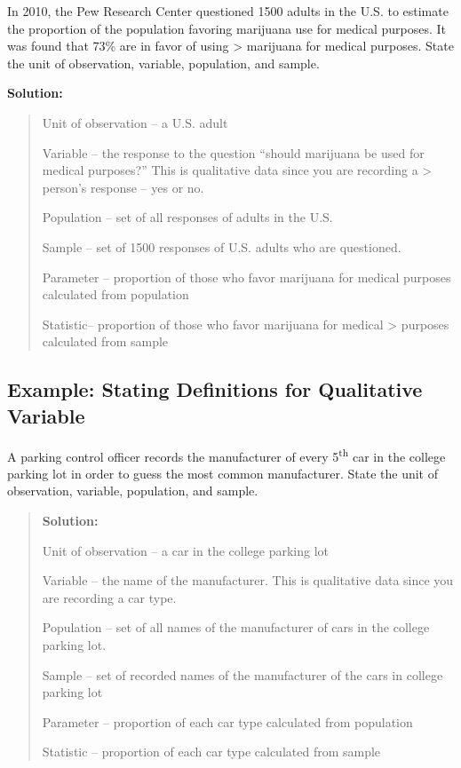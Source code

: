 \documentclass[]{book}
\begin{document}
In 2010, the Pew Research Center questioned 1500 adults in the U.S. to estimate the proportion of the population favoring marijuana use for medical purposes. It was found that 73\% are in favor of using \textgreater{} marijuana for medical purposes. State the unit of observation, variable, population, and sample.

\textbf{Solution:}

\begin{quote}
Unit of observation -- a U.S. adult

Variable -- the response to the question ``should marijuana be used for medical purposes?'' This is qualitative data since you are recording a \textgreater{} person's response -- yes or no.

Population -- set of all responses of adults in the U.S.

Sample -- set of 1500 responses of U.S. adults who are questioned.

Parameter -- proportion of those who favor marijuana for medical purposes calculated from population

Statistic-- proportion of those who favor marijuana for medical \textgreater{} purposes calculated from sample
\end{quote}

\hypertarget{example-stating-definitions-for-qualitative-variable-1}{%
\subsection{Example: Stating Definitions for Qualitative Variable}\label{example-stating-definitions-for-qualitative-variable-1}}

A parking control officer records the manufacturer of every 5\textsuperscript{th} car in the college parking lot in order to guess the most common manufacturer. State the unit of observation, variable, population, and sample.

\begin{quote}
\textbf{Solution:}

Unit of observation -- a car in the college parking lot

Variable -- the name of the manufacturer. This is qualitative data since you are recording a car type.

Population -- set of all names of the manufacturer of cars in the college parking lot.

Sample -- set of recorded names of the manufacturer of the cars in college parking lot

Parameter -- proportion of each car type calculated from population

Statistic -- proportion of each car type calculated from sample
\end{quote}
\end{document}
